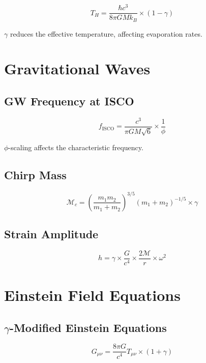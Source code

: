 \documentclass[12pt,a4paper]{article}
\begin{document}
\begin{equation}
T_H = \frac{\hbar c^3}{8\pi GM k_B} \times (1 - \gamma)
\end{equation}

$\gamma$ reduces the effective temperature, affecting evaporation rates.

\section{Gravitational Waves}

\subsection{GW Frequency at ISCO}

\begin{equation}
f_{\text{ISCO}} = \frac{c^3}{\pi GM\sqrt{6}} \times \frac{1}{\phi}
\end{equation}

$\phi$-scaling affects the characteristic frequency.

\subsection{Chirp Mass}

\begin{equation}
\mathcal{M}_c = \left(\frac{m_1 m_2}{m_1 + m_2}\right)^{3/5} (m_1 + m_2)^{-1/5} \times \gamma
\end{equation}

\subsection{Strain Amplitude}

\begin{equation}
h = \gamma \times \frac{G}{c^4} \times \frac{2\mathcal{M}}{r} \times \omega^2
\end{equation}

\section{Einstein Field Equations}

\subsection{$\gamma$-Modified Einstein Equations}

\begin{equation}
G_{\mu\nu} = \frac{8\pi G}{c^4} T_{\mu\nu} \times (1 + \gamma)
\end{equation}
\end{document}
